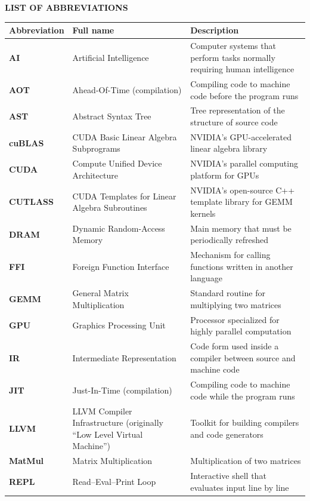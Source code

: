 \documentclass[a4paper]{article}
\begin{document}
    \vspace{10cm}
	\vspace{18pt}
	\begin{center}
		\textbf{LIST OF ABBREVIATIONS}
	\end{center}
	\vspace{-6pt}
	\begin{center}
		\renewcommand{\arraystretch}{1.15}
		\begin{tabular}{>{\bfseries}l >{\raggedright\arraybackslash}p{5.8cm} >{\raggedright\arraybackslash}p{5.8cm}}
			\toprule
			\textbf{Abbreviation} & \textbf{Full name} & \textbf{Description} \\
			\midrule
			AI      & Artificial Intelligence & Computer systems that perform tasks normally requiring human intelligence \\
			AOT     & Ahead-Of-Time (compilation) & Compiling code to machine code before the program runs \\
			AST     & Abstract Syntax Tree & Tree representation of the structure of source code \\
			cuBLAS  & CUDA Basic Linear Algebra Subprograms & NVIDIA's GPU-accelerated linear algebra library \\
			CUDA    & Compute Unified Device Architecture & NVIDIA's parallel computing platform for GPUs \\
			CUTLASS & CUDA Templates for Linear Algebra Subroutines & NVIDIA's open-source C++ template library for GEMM kernels \\
			DRAM    & Dynamic Random-Access Memory & Main memory that must be periodically refreshed \\
			FFI     & Foreign Function Interface & Mechanism for calling functions written in another language \\
			GEMM    & General Matrix Multiplication & Standard routine for multiplying two matrices \\
			GPU     & Graphics Processing Unit & Processor specialized for highly parallel computation \\
			IR      & Intermediate Representation & Code form used inside a compiler between source and machine code \\
			JIT     & Just-In-Time (compilation) & Compiling code to machine code while the program runs \\
			LLVM    & LLVM Compiler Infrastructure (originally ``Low Level Virtual Machine'') & Toolkit for building compilers and code generators \\
			MatMul  & Matrix Multiplication & Multiplication of two matrices \\
			REPL    & Read--Eval--Print Loop & Interactive shell that evaluates input line by line \\
			\bottomrule
		\end{tabular}
	\end{center}
	
\end{document}
